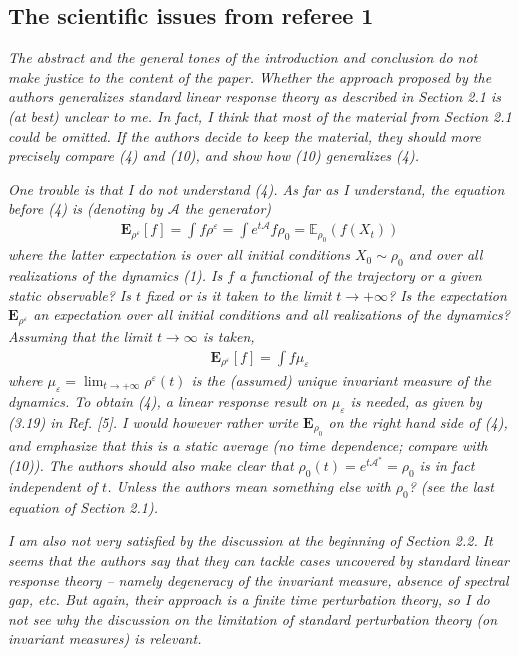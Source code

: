 \documentclass[]{revtex4-1}
\newcommand{\fwg}{{\mathcal A}}
\begin{document}
\subsection*{The scientific issues from referee 1}

\emph{
The abstract and the general tones of the introduction and conclusion do not make justice to
the content of the paper. Whether the approach proposed by the authors generalizes standard
linear response theory as described in Section 2.1 is (at best) unclear to me. In fact, I think
that most of the material from Section 2.1 could be omitted. If the authors decide to keep the
material, they should more precisely compare (4) and (10), and show how (10) generalizes (4).
}

\emph{
One trouble is that I do not understand (4). As far as I understand, the equation before (4)
is (denoting by $\fwg$ the generator)
\begin{align*}
  \textbf{E}_{\rho^\varepsilon}[f] = \int f\rho^\varepsilon = \int e^{t\fwg} f\rho_0 = \mathbb{E}_{\rho_0}(f(X_t))
\end{align*}
where the latter expectation is over all initial conditions $X_0\sim\rho_0$ and over all realizations of
the dynamics (1). Is $f$ a functional of the trajectory or a given static observable? Is $t$ fixed
or is it taken to the limit $t \rightarrow+\infty$? Is the expectation $\textbf{E}_{\rho^\varepsilon}$
an expectation over all initial
conditions and all realizations of the dynamics? Assuming that the limit $t \rightarrow\infty$ is taken,
\begin{align*}
  \textbf{E}_{\rho^\varepsilon}[f] = \int f\mu_\varepsilon
\end{align*}
where $\mu_\varepsilon = \lim_{t\rightarrow+\infty}\rho^{\varepsilon}(t)$ is the (assumed) unique invariant measure of the dynamics. To
obtain (4), a linear response result on $\mu_{\varepsilon}$ is needed, as given by (3.19) in Ref. [5]. I would however rather write $\textbf{E}_{\rho_0}$ on the right hand side of (4), and emphasize that this is a static
average (no time dependence; compare with (10)). The authors should also make clear that
$\rho_0 (t) = e^{t\fwg^\ast} = \rho_0$ is in fact independent of $t$. Unless the authors mean something else with
$\rho_0$? (see the last equation of Section 2.1).
}

\emph{
I am also not very satisfied by the discussion at the beginning of Section 2.2. It seems
that the authors say that they can tackle cases uncovered by standard linear response theory
-- namely degeneracy of the invariant measure, absence of spectral gap, etc. But again, their
approach is a finite time perturbation theory, so I do not see why the discussion on the
limitation of standard perturbation theory (on invariant measures) is relevant.
}\\
\end{document}
